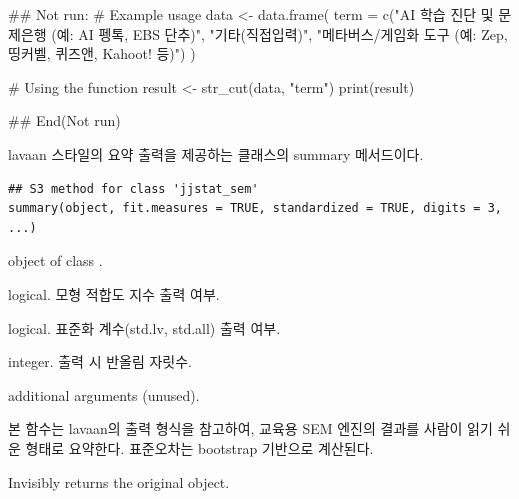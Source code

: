 \documentclass[a4paper]{book}
\begin{document}
%
\begin{Examples}
\begin{ExampleCode}
\#\# Not run: 
# Example usage
data <- data.frame(
  term = c("AI 학습 진단 및 문제은행 (예: AI 펭톡, EBS 단추)",
           "기타(직접입력)",
           "메타버스/게임화 도구 (예: Zep, 띵커벨, 퀴즈앤, Kahoot! 등)")
)

# Using the function
result <- str_cut(data, "term")
print(result)

## End(Not run)
\end{ExampleCode}
\end{Examples}
%
\begin{Description}
lavaan 스타일의 요약 출력을 제공하는
 클래스의 summary 메서드이다.
\end{Description}
%
\begin{Usage}
\begin{verbatim}
## S3 method for class 'jjstat_sem'
summary(object, fit.measures = TRUE, standardized = TRUE, digits = 3, ...)
\end{verbatim}
\end{Usage}
%
\begin{Arguments}
\begin{ldescription}
\item[\code{object}] object of class .

\item[\code{fit.measures}] logical.
모형 적합도 지수 출력 여부.

\item[\code{standardized}] logical.
표준화 계수(std.lv, std.all) 출력 여부.

\item[\code{digits}] integer.
출력 시 반올림 자릿수.

\item[\code{...}] additional arguments (unused).
\end{ldescription}
\end{Arguments}
%
\begin{Details}
본 함수는 lavaan의  출력 형식을 참고하여,
교육용 SEM 엔진의 결과를 사람이 읽기 쉬운 형태로 요약한다.
표준오차는 bootstrap 기반으로 계산된다.
\end{Details}
%
\begin{Value}
Invisibly returns the original  object.
\end{Value}
\end{document}
